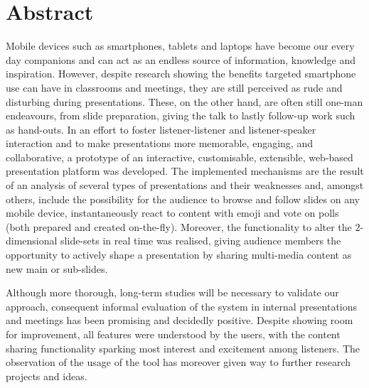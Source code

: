 \chapter{Abstract}
Mobile devices such as smartphones, tablets and laptops have become our every day companions and can act as an endless source of information, knowledge and inspiration. However, despite research showing the benefits targeted smartphone use can have in classrooms and meetings, they are still perceived as rude and disturbing during presentations. These, on the other hand, are often still one-man endeavours, from slide preparation, giving the talk to lastly follow-up work such as hand-outs. In an effort to foster listener-listener and listener-speaker interaction and to make presentations more memorable, engaging, and collaborative, a prototype of an interactive, customisable, extensible, web-based presentation platform was developed. The implemented mechanisms are the result of an analysis of several types of presentations and their weaknesses and, amongst others, include the possibility for the audience to browse and follow slides on any mobile device, instantaneously react to content with emoji and vote on polls (both prepared and created on-the-fly). Moreover, the functionality to alter the $2$-dimensional slide-sets in real time was realised, giving audience members the opportunity to actively shape a presentation by sharing multi-media content as new main or sub-slides.

Although more thorough, long-term studies will be necessary to validate our approach, consequent informal evaluation of the system in internal presentations and meetings has been promising and decidedly positive. Despite showing room for improvement, all features were understood by the users, with the content sharing functionality sparking most interest and excitement among listeners. The observation of the usage of the tool has moreover given way to further research projects and ideas. 
